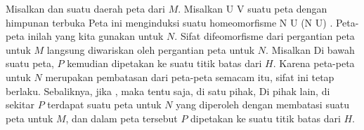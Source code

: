 Misalkan
 dan
 suatu daerah peta dari $M$. Misalkan
\maabbdisp {\alpha} { U } {V
} {}
suatu peta dengan himpunan terbuka
 Peta ini menginduksi suatu homeomorfisme
\maabbdisp {} {N \cap U} { \alpha (N \cap U)
} {.}
Peta-peta inilah yang kita gunakan untuk $N$. Sifat difeomorfisme dari pergantian peta untuk $M$ langsung diwariskan oleh pergantian peta untuk $N$. Misalkan
 Di bawah suatu peta, $P$ kemudian dipetakan ke suatu titik batas dari $H$. Karena peta-peta untuk $N$ merupakan pembatasan dari peta-peta semacam itu, sifat ini tetap berlaku. Sebaliknya, jika
, maka tentu saja, di satu pihak,
 Di pihak lain, di sekitar $P$ terdapat suatu peta untuk $N$ yang diperoleh dengan membatasi suatu peta untuk $M$, dan dalam peta tersebut $P$ dipetakan ke suatu titik batas dari $H$.
